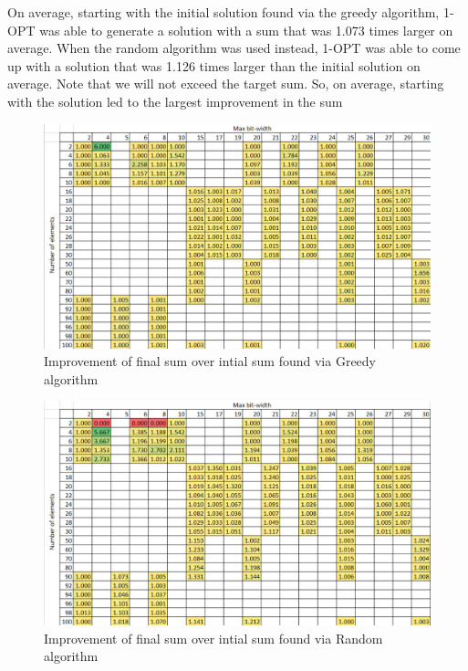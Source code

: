 \documentclass{report}
\begin{document}
On average, starting with the initial solution found via the greedy algorithm, 1-OPT was able to generate a solution
with a sum that was 1.073 times larger on average. When the random algorithm was used instead, 1-OPT was able to come up
with a solution that was 1.126 times larger than the initial solution on average. Note that we will not exceed the target sum.
So, on average, starting with the solution led to the largest improvement in the sum

\begin{figure}[h]
  \centering
  \includegraphics[width=12cm]{p5_greedy_final_over_initial.png}
  \caption{Improvement of final sum over intial sum found via Greedy algorithm}
  \label{fig:greedy_final_initial_compare}
\end{figure}

\begin{figure}[h]
  \centering
  \includegraphics[width=12cm]{p5_random_final_over_initial.png}
  \caption{Improvement of final sum over intial sum found via Random algorithm}
  \label{fig:random_final_initial_compare}
\end{figure}
\end{document}
